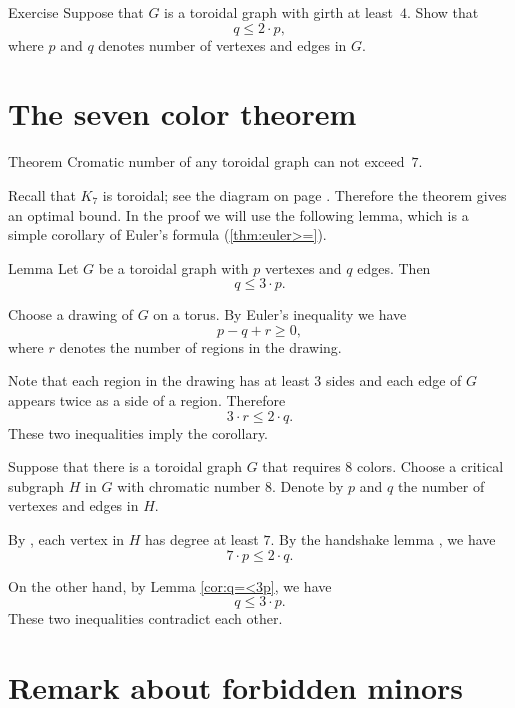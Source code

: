 \begin{thm}{Exercise}
Suppose that $G$ is a toroidal graph with girth at least~$4$.
Show that 
\[q\le 2\cdot p,\]
where $p$ and $q$ denotes number of vertexes and edges in $G$.
\end{thm}

\section*{The seven color theorem}

\begin{thm}{Theorem}\label{thm:7-colors}
Cromatic number of any toroidal graph can not exceed~$7$.
\end{thm}

Recall that $K_7$ is toroidal; see the diagram on page \pageref{K5-toroidal}.
Therefore the theorem gives an optimal bound.
In the proof we will use the following lemma, which is a simple corollary of Euler's formula (\ref{thm:euler>=}).

\begin{thm}{Lemma}\label{cor:q=<3p}
Let $G$ be a toroidal graph with $p$ vertexes and $q$ edges.
Then 
\[q\le 3\cdot p.\]

\end{thm}

Choose a drawing of $G$ on a torus.
By Euler's inequality we have
\[p-q+r\ge 0,\]
where $r$ denotes the number of regions in the drawing.

Note that each region in the drawing has at least $3$ sides
and each edge of $G$ appears twice as a side of a region.
Therefore 
\[3\cdot r\le 2\cdot q.\]
These two inequalities imply the corollary.
\qeds


Suppose that there is a toroidal graph $G$ that requires $8$ colors.
Choose a critical subgraph $H$ in $G$ with chromatic number 8.
Denote by $p$ and $q$ the number of vertexes and edges in $H$.

By \cite[2.1.3]{hartsfield-ringel}, each vertex in $H$ has degree at least $7$.
By the handshake lemma \cite[1.1.1]{hartsfield-ringel}, we have 
\[7\cdot p\le 2\cdot q.\]

On the other hand, by Lemma \ref{cor:q=<3p}, we have
\[q\le 3\cdot p.\]
These two inequalities contradict each other.
 \qeds

\section*{Remark about forbidden minors}

